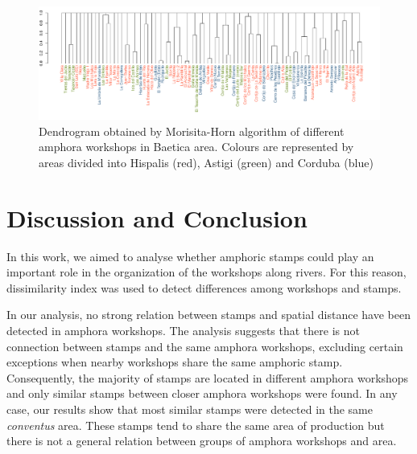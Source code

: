 \documentclass[review]{elsarticle}
\newcommand{\memo}[2]{\textcolor{#1}{#2}}
\newcommand{\xavi}[1]{\memo{magenta}{XRC: #1\\}}
\begin{document}
\begin{figure}[htp]
	\centering
\includegraphics[width=\linewidth]{figs/dendro}
\caption{Dendrogram obtained by Morisita-Horn algorithm of different amphora workshops in Baetica area. Colours are represented by areas divided into Hispalis (red), Astigi (green) and Corduba (blue)}
\label{dendro}
\end{figure} 





\section{Discussion and Conclusion}


In this work, we aimed to analyse whether amphoric stamps could play an important role in the organization of the workshops along rivers. For this reason, dissimilarity index was used to detect differences among workshops and stamps. 

In our analysis, no strong relation between stamps and spatial distance have been detected in amphora workshops. The analysis suggests that there is not connection between stamps and the same amphora workshops, excluding certain exceptions when nearby workshops share the same amphoric stamp. Consequently, the majority of stamps are located in different amphora workshops and only similar stamps between closer amphora workshops were found. In any case, our results show that most similar stamps were detected in the same \textit{conventus} area. These stamps tend to share the same area of production but there is not a general relation between groups of amphora workshops and area. 
\end{document}
